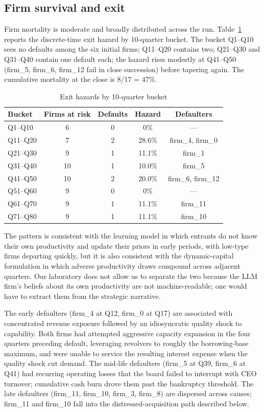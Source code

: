 \documentclass[11pt]{article}
\begin{document}
\subsection{Firm survival and exit}

Firm mortality is moderate and broadly distributed across the run.
Table~\ref{tab:hazards} reports the discrete-time exit hazard by
10-quarter bucket. The bucket Q1--Q10 sees no defaults among the six
initial firms; Q11--Q20 contains two; Q21--Q30 and Q31--Q40 contain
one default each; the hazard rises modestly at Q41--Q50 (firm\_5,
firm\_6, firm\_12 fail in close succession) before tapering again.
The cumulative mortality at the close is 8/17 = 47\%.

\begin{table}[t]\centering\small
\caption{Exit hazards by 10-quarter bucket}\label{tab:hazards}
\begin{tabular}{lcccc}
\toprule
Bucket & Firms at risk & Defaults & Hazard & Defaulters \\
\midrule
Q1--Q10   & 6 & 0 & 0\%  & --- \\
Q11--Q20  & 7 & 2 & 28.6\% & firm\_4, firm\_0 \\
Q21--Q30  & 9 & 1 & 11.1\% & firm\_1 \\
Q31--Q40  & 10 & 1 & 10.0\% & firm\_5 \\
Q41--Q50  & 10 & 2 & 20.0\% & firm\_6, firm\_12 \\
Q51--Q60  & 9 & 0 & 0\% & --- \\
Q61--Q70  & 9 & 1 & 11.1\% & firm\_11 \\
Q71--Q80  & 9 & 1 & 11.1\% & firm\_10 \\
\bottomrule
\end{tabular}
\end{table}

The pattern is consistent with the \citet{jovanovic1982} learning model
in which entrants do not know their own productivity and update their
priors in early periods, with low-type firms departing quickly, but it
is also consistent with the \citet{ericsonpakes1995} dynamic-capital
formulation in which adverse productivity draws compound across
adjacent quarters. Our laboratory does not allow us to separate the two
because the LLM firm's beliefs about its own productivity are not
machine-readable; one would have to extract them from the strategic
narrative.

The early defaulters (firm\_4 at Q12, firm\_0 at Q17) are associated
with concentrated revenue exposure followed by an idiosyncratic
quality shock to capability. Both firms had attempted aggressive
capacity expansion in the four quarters preceding default, leveraging
revolvers to roughly the borrowing-base maximum, and were unable to
service the resulting interest expense when the quality shock cut
demand. The mid-life defaulters (firm\_5 at Q39, firm\_6 at Q41) had
recurring operating losses that the board failed to interrupt with CEO
turnover; cumulative cash burn drove them past the bankruptcy
threshold. The late defaulters (firm\_11, firm\_10, firm\_3, firm\_8)
are dispersed across causes; firm\_11 and firm\_10 fall into the
distressed-acquisition path described below.
\end{document}

